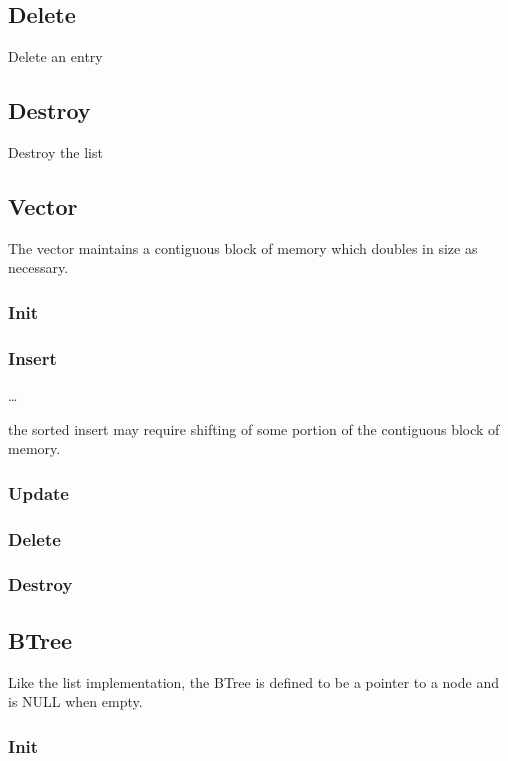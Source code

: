 \documentclass[twocolumn]{article}
\begin{document}
\subsection{Delete}

Delete an entry

\subsection{Destroy}

Destroy the list

\subsection{Vector}

The vector maintains a contiguous block of memory which doubles in size as
necessary.

\subsubsection{Init}

\subsubsection{Insert}

\dots

the sorted insert may require shifting of some portion of the contiguous block
of memory.

\subsubsection{Update}

\subsubsection{Delete}

\subsubsection{Destroy}

\subsection{BTree}

Like the list implementation, the BTree is defined to be a pointer to a node and
is NULL when empty.

\subsubsection{Init}
\end{document}
